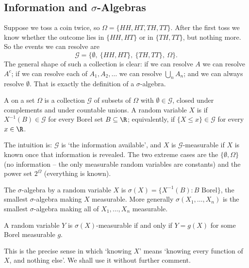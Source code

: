 \subsection{Information and \texorpdfstring{$\sigma$}{sigma}-Algebras}

Suppose we toss a coin twice, so $\Omega = \{HH, HT, TH, TT\}$. After the first toss we know whether the outcome lies in $\{HH,HT\}$ or in $\{TH,TT\}$, but nothing more. So the events we can resolve are
$$
\mathcal{G} = \big\{\emptyset,\ \{HH,HT\},\ \{TH,TT\},\ \Omega\big\}.
$$
The general shape of such a collection is clear: if we can resolve $A$ we can resolve $A^c$; if we can resolve each of $A_1, A_2, \dots$ we can resolve $\bigcup_n A_n$; and we can always resolve $\emptyset$. That is exactly the definition of a $\sigma$-algebra.

\begin{definition}
	A  on a set $\Omega$ is a collection $\mathcal{G}$ of subsets of $\Omega$ with $\emptyset \in \mathcal{G}$, closed under complements and under countable unions. A random variable $X$ is  if $X^{-1}(B) \in \mathcal{G}$ for every Borel set $B \subseteq \R$; equivalently, if $\{X \leq x\} \in \mathcal{G}$ for every $x \in \R$.
\end{definition}

The intuition is: $\mathcal{G}$ is `the information available', and $X$ is $\mathcal{G}$-measurable if $X$ is known once that information is revealed. The two extreme cases are the  $\{\emptyset,\Omega\}$ (no information -- the only measurable random variables are constants) and the power set $2^\Omega$ (everything is known).

\begin{definition}
	The $\sigma$-algebra  by a random variable $X$ is $\sigma(X) = \{X^{-1}(B) : B \text{ Borel}\}$, the smallest $\sigma$-algebra making $X$ measurable. More generally $\sigma(X_1,\dots,X_n)$ is the smallest $\sigma$-algebra making all of $X_1,\dots,X_n$ measurable.
\end{definition}

\begin{fact}
	A random variable $Y$ is $\sigma(X)$-measurable if and only if $Y = g(X)$ for some Borel measurable $g$.
\end{fact}

This is the precise sense in which `knowing $X$' means `knowing every function of $X$, and nothing else'. We shall use it without further comment.

